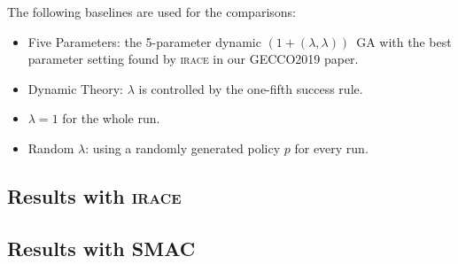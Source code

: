 \documentclass{article}
\newcommand{\opll}{$(1+(\lambda,\lambda))$~GA\xspace}
\newcommand{\irace}{\textsc{irace}\xspace}
\newcommand{\smac}{\textsc{SMAC}\xspace}
\begin{document}
The following baselines are used for the comparisons:
\begin{itemize}
    \item Five Parameters: the 5-parameter dynamic \opll with the best parameter setting found by \irace in our GECCO2019 paper.
    \item Dynamic Theory: $\lambda$ is controlled by the one-fifth success rule.
    \item $\lambda=1$ for the whole run.
    \item Random $\lambda$: using a randomly generated policy $p$ for every run.
\end{itemize}

\subsection{Results with \irace}


\subsection{Results with \smac}
\end{document}
